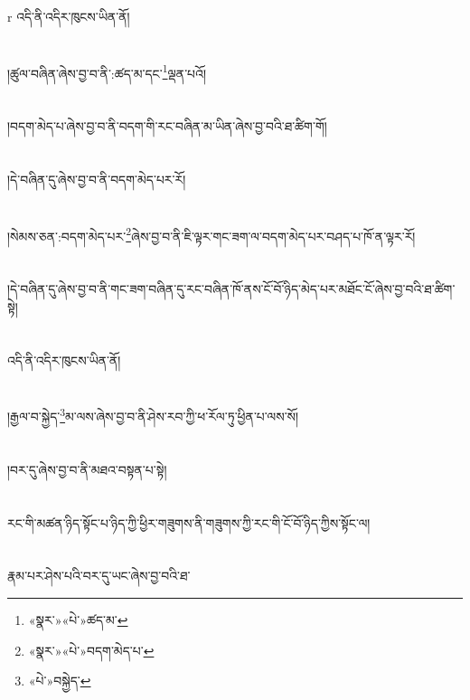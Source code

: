 r{ }འདི་ནི་འདིར་ཁུངས་ཡིན་ནོ།\chapter{ }།ཚུལ་བཞིན་ཞེས་བྱ་བ་ནི་:ཚད་མ་དང་\footnote{«སྣར་»«པེ་»ཚད་མ་}ལྡན་པའོ།\chapter{ }།བདག་མེད་པ་ཞེས་བྱ་བ་ནི་བདག་གི་རང་བཞིན་མ་ཡིན་ཞེས་བྱ་བའི་ཐ་ཚིག་གོ།\chapter{ }།དེ་བཞིན་དུ་ཞེས་བྱ་བ་ནི་བདག་མེད་པར་རོ།\chapter{ }།སེམས་ཅན་:བདག་མེད་པར་\footnote{«སྣར་»«པེ་»བདག་མེད་པ་}ཞེས་བྱ་བ་ནི་ཇི་ལྟར་གང་ཟག་ལ་བདག་མེད་པར་བཤད་པ་ཁོ་ན་ལྟར་རོ།\chapter{ }།དེ་བཞིན་དུ་ཞེས་བྱ་བ་ནི་གང་ཟག་བཞིན་དུ་རང་བཞིན་ཁོ་ནས་ངོ་བོ་ཉིད་མེད་པར་མཐོང་ངོ་ཞེས་བྱ་བའི་ཐ་ཚིག་སྟེ།\chapter{ }འདི་ནི་འདིར་ཁུངས་ཡིན་ནོ།\chapter{ }།རྒྱལ་བ་སྐྱེད་\footnote{«པེ་»བསྐྱེད་}མ་ལས་ཞེས་བྱ་བ་ནི་ཤེས་རབ་ཀྱི་ཕ་རོལ་ཏུ་ཕྱིན་པ་ལས་སོ།\chapter{ }།བར་དུ་ཞེས་བྱ་བ་ནི་མཐའ་བསྟན་པ་སྟེ།\chapter{ }རང་གི་མཚན་ཉིད་སྟོང་པ་ཉིད་ཀྱི་ཕྱིར་གཟུགས་ནི་གཟུགས་ཀྱི་རང་གི་ངོ་བོ་ཉིད་ཀྱིས་སྟོང་ལ།\chapter{ }རྣམ་པར་ཤེས་པའི་བར་དུ་ཡང་ཞེས་བྱ་བའི་ཐ་